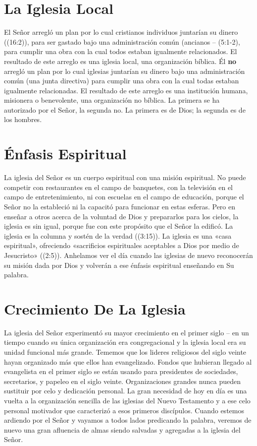 \documentclass[12pt, twoside, openright]{book}
\begin{document}
\section{La Iglesia Local}
El Señor arregló un plan por lo cual cristianos individuos juntarían su dinero ((16:2)), para ser gastado bajo una administración común (ancianos – (5:1-2), para cumplir una obra con la cual todos estaban igualmente relacionados. El resultado de este arreglo es una iglesia local, una organización bíblica. Él \textbf{no} arregló un plan por lo cual iglesias juntarían su dinero bajo una administración común (una junta directiva) para cumplir una obra con la cual todas estaban igualmente relacionadas. El resultado de este arreglo es una institución humana, misionera o benevolente, una organización no bíblica. La primera se ha autorizado por el Señor, la segunda no. La primera es de Dios; la segunda es de los hombres.

\section{Énfasis Espiritual}
La iglesia del Señor es un cuerpo espiritual con una misión espiritual. No puede competir con restaurantes en el campo de banquetes, con la televisión en el campo de entretenimiento, ni con escuelas en el campo de educación, porque el Señor no la estableció ni la capacitó para funcionar en estas esferas. Pero en enseñar a otros acerca de la voluntad de Dios y prepararlos para los cielos, la iglesia es sin igual, porque fue con este propósito que el Señor la edificó. La iglesia es la columna y sostén de la verdad ((3:15)). La iglesia es una «casa espiritual», ofreciendo «sacrificios espirituales aceptables a Dios por medio de Jesucristo» ((2:5)).  Anhelamos ver el día cuando las iglesias de nuevo reconocerán su misión dada por Dios y volverán a ese énfasis espiritual enseñando en Su palabra.

\section{Crecimiento De La Iglesia}
La iglesia del Señor experimentó su mayor crecimiento en el primer siglo – en un tiempo cuando su única organización era congregacional y la iglesia local era su unidad funcional más grande. Tememos que los lideres religiosos del siglo veinte hayan organizado más que ellos han evangelizado. Fondos que hubieran llegado al evangelista en el primer siglo se están usando para presidentes de sociedades, secretarios, y papeleo en el siglo veinte. Organizaciones grandes nunca pueden sustituir por celo y dedicación personal. La gran necesidad de hoy en día es una vuelta a la organización sencilla de las iglesias del Nuevo Testamento y a ese celo personal motivador que caracterizó a esos primeros discípulos. Cuando estemos ardiendo por el Señor y vayamos a todos lados predicando la palabra, veremos de nuevo una gran afluencia de almas siendo salvadas y agregadas a la iglesia del Señor.
\end{document}
